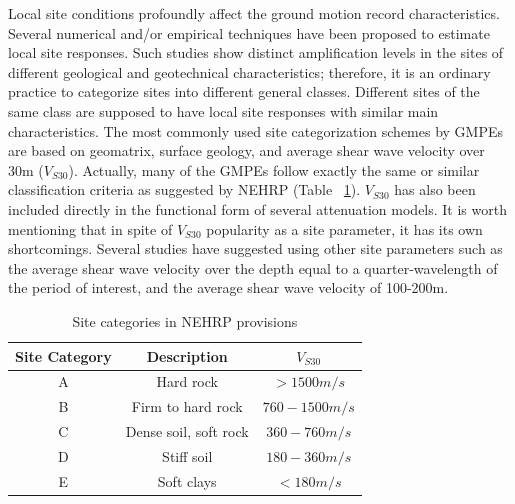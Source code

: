 Local site conditions profoundly affect the ground motion record
characteristics. Several numerical and/or empirical techniques have
been proposed to estimate local site responses. Such studies show
distinct amplification levels in the sites of different geological
and geotechnical characteristics; therefore, it is an ordinary
practice to categorize sites into different general classes.
Different sites of the same class are supposed to have local site
responses with similar main characteristics. The most commonly used
site categorization schemes by GMPEs are based on geomatrix, surface
geology, and average shear wave velocity over 30m ($V_{S30}$).
Actually, many of the GMPEs follow exactly the same or similar
classification criteria as suggested by NEHRP (Table ~\ref{NEHRP}).
$V_{S30}$ has also been included directly in the functional form of
several attenuation models. It is worth mentioning that in spite of
$V_{S30}$ popularity as a site parameter, it has its own
shortcomings. Several studies have suggested using other site
parameters such as the average shear wave velocity over the depth
equal to a quarter-wavelength of the period of interest, and the
average shear wave velocity of 100-200m.
\begin{table}[!t]
\renewcommand{\arraystretch}{1.3}
\caption{Site categories in NEHRP provisions} \label{NEHRP}
\centering
\begin{tabular}{|c|c|c|}
\hline
Site Category & Description & $V_{S30}$\\
\hline
A & Hard rock & $>1500 m/s$\\
\hline
B & Firm to hard rock & $760-1500 m/s$\\
\hline
C & Dense soil, soft rock & $360-760 m/s$\\
\hline
D & Stiff soil & $180-360 m/s$\\
\hline
E & Soft clays & $<180 m/s$\\
\hline
\end{tabular}
\end{table}

